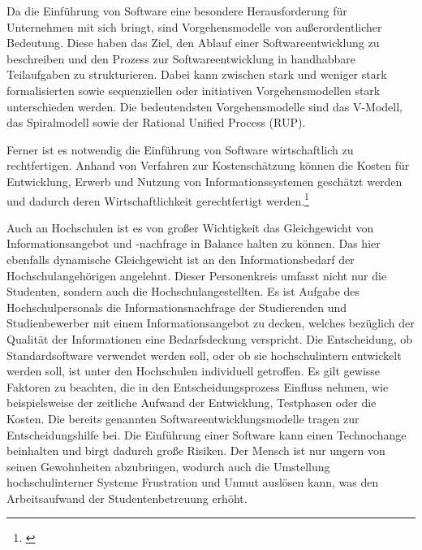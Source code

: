 Da die Einführung von Software eine besondere Herausforderung für Unternehmen mit sich bringt, sind Vorgehensmodelle von außerordentlicher Bedeutung. 
Diese haben das Ziel, den Ablauf einer Softwareentwicklung zu beschreiben und den Prozess zur Softwareentwicklung in handhabbare Teilaufgaben zu strukturieren. 
Dabei kann zwischen stark und weniger stark formalisierten sowie sequenziellen oder initiativen Vorgehensmodellen stark unterschieden werden. 
Die bedeutendsten Vorgehensmodelle sind das V-Modell, das Spiralmodell sowie der Rational Unified Process (RUP).

Ferner ist es notwendig die Einführung von Software wirtschaftlich zu rechtfertigen. Anhand von Verfahren zur Kostenschätzung können die Kosten für Entwicklung, Erwerb und Nutzung von Informationssystemen geschätzt werden und dadurch deren Wirtschaftlichkeit gerechtfertigt werden.\footnote{\cite{krcmar_einfuhrung_2015}}

Auch an Hochschulen ist es von großer Wichtigkeit das Gleichgewicht von Informationsangebot und -nachfrage in Balance halten zu können. 
Das hier ebenfalls dynamische Gleichgewicht ist an den Informationsbedarf der Hochschulangehörigen angelehnt. 
Dieser Personenkreis umfasst nicht nur die Studenten, sondern auch die Hochschulangestellten. 
Es ist Aufgabe des Hochschulpersonals die Informationsnachfrage der Studierenden und Studienbewerber mit einem Informationsangebot zu decken, welches bezüglich der Qualität der Informationen eine Bedarfsdeckung verspricht. 
Die Entscheidung, ob Standardsoftware verwendet werden soll, oder ob sie hochschulintern entwickelt werden soll, ist unter den Hochschulen individuell getroffen. 
Es gilt gewisse Faktoren zu beachten, die in den Entscheidungsprozess Einfluss nehmen, wie beispielsweise der zeitliche Aufwand der Entwicklung, Testphasen oder die Kosten. 
Die bereits genannten Softwareentwicklungsmodelle tragen zur Entscheidungshilfe bei.
Die Einführung einer Software kann einen Technochange beinhalten und birgt dadurch große Risiken. 
Der Mensch ist nur ungern von seinen Gewohnheiten abzubringen, wodurch auch die Umstellung hochschulinterner Systeme Frustration und Unmut auslösen kann, was den Arbeitsaufwand der Studentenbetreuung erhöht.